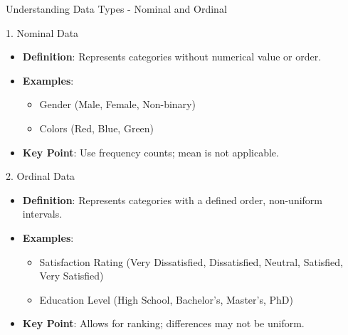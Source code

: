 \documentclass[aspectratio=169]{beamer}
\begin{document}
\begin{frame}[fragile]{Understanding Data Types - Nominal and Ordinal}
    \begin{block}{1. Nominal Data}
        \begin{itemize}
            \item \textbf{Definition}: Represents categories without numerical value or order.
            \item \textbf{Examples}:
                \begin{itemize}
                    \item Gender (Male, Female, Non-binary)
                    \item Colors (Red, Blue, Green)
                \end{itemize}
            \item \textbf{Key Point}: Use frequency counts; mean is not applicable.
        \end{itemize}
    \end{block}
    
    \begin{block}{2. Ordinal Data}
        \begin{itemize}
            \item \textbf{Definition}: Represents categories with a defined order, non-uniform intervals.
            \item \textbf{Examples}:
                \begin{itemize}
                    \item Satisfaction Rating (Very Dissatisfied, Dissatisfied, Neutral, Satisfied, Very Satisfied)
                    \item Education Level (High School, Bachelor's, Master's, PhD)
                \end{itemize}
            \item \textbf{Key Point}: Allows for ranking; differences may not be uniform.
        \end{itemize}
    \end{block}
\end{frame}
\end{document}
